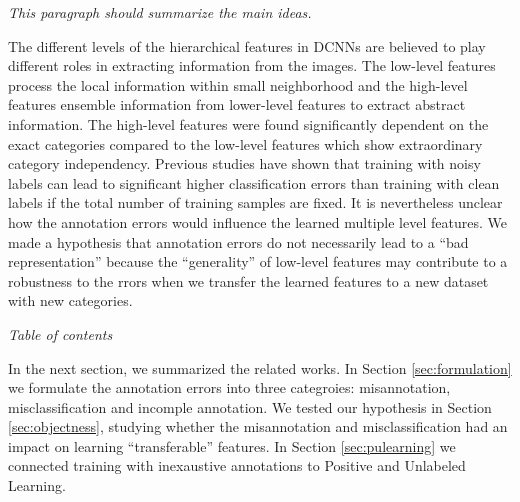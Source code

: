 \noindent
\textit{This paragraph should summarize the main ideas.}

\noindent
The different levels of the hierarchical features in DCNNs are believed to play different roles in extracting information from the images.
The low-level features process the local information within small neighborhood and the high-level features ensemble information from lower-level features to extract abstract information.
The high-level features were found significantly dependent on the exact categories compared to the low-level features which show extraordinary category independency.\cite{yosinski2014transferable}
Previous studies\cite{sukhbaatar2014training,patrini2016making} have shown that training with noisy labels can lead to significant higher classification errors than training with clean labels if the total number of training samples are fixed.
It is nevertheless unclear how the annotation errors would influence the learned multiple level features.
We made a hypothesis that annotation errors do not necessarily lead to a ``bad representation'' because the ``generality'' of low-level features may contribute to a robustness to the rrors when we transfer the learned features to a new dataset with new categories.

\noindent
\textit{Table of contents}

\noindent
In the next section, we summarized the related works.
In Section \ref{sec:formulation} we formulate the annotation errors into three categroies: misannotation, misclassification and incomple annotation.
We tested our hypothesis in Section \ref{sec:objectness}, studying whether the misannotation and misclassification had an impact on learning ``transferable'' features.
In Section \ref{sec:pulearning} we connected training with inexaustive annotations to Positive and Unlabeled Learning.


%
